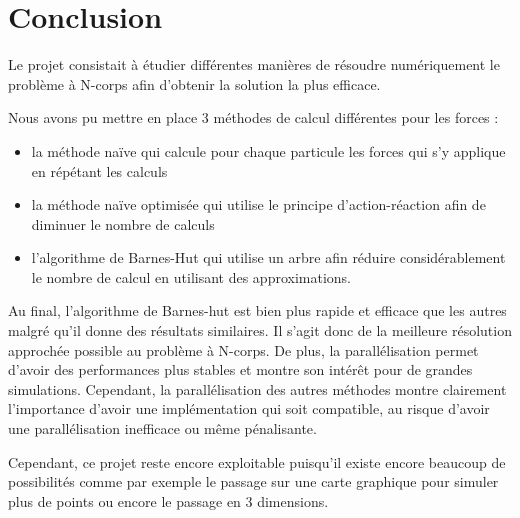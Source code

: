 \chapter{Conclusion}

Le projet consistait à étudier différentes manières de résoudre numériquement le problème à N-corps afin d'obtenir la solution la plus efficace.

Nous avons pu mettre en place $3$ méthodes de calcul différentes pour les forces :

\begin{itemize}
\item la méthode naïve qui calcule pour chaque particule les forces qui s'y applique en répétant les calculs

\item la méthode naïve optimisée qui utilise le principe d'action-réaction afin de diminuer le nombre de calculs

\item l'algorithme de Barnes-Hut qui utilise un arbre afin réduire considérablement le nombre de calcul en utilisant des approximations.

\end{itemize}

Au final, l'algorithme de Barnes-hut est bien plus rapide et efficace que les autres malgré qu'il donne des résultats similaires. Il s'agit donc de la meilleure résolution approchée possible au problème à N-corps. De plus, la parallélisation permet d'avoir des performances plus stables et montre son intérêt pour de grandes simulations. Cependant, la parallélisation des autres méthodes montre clairement l'importance d'avoir une implémentation qui soit compatible, au risque d'avoir une parallélisation inefficace ou même pénalisante.

Cependant, ce projet reste encore exploitable puisqu'il existe encore beaucoup de possibilités comme par exemple le passage sur une carte graphique pour simuler plus de points ou encore le passage en 3 dimensions.


